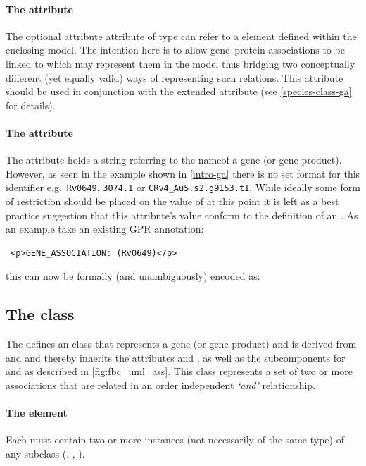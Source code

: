 \paragraph{The  attribute}
The optional attribute  attribute of type  can  refer to a \Species element defined within the enclosing model. The intention here is to allow gene--protein associations to be linked to \Species which may represent them in the model thus bridging two conceptually different (yet equally valid) ways of representing such relations. This attribute should be used in conjunction with the extended \Species attribute  (see \ref{species-class-ga} for details).

\paragraph{The  attribute}
The  attribute holds a string referring to the nameof a gene (or gene product). However, as seen in the example shown in \ref{intro-ga} there is no set format for this identifier e.g.~\verb+Rv0649+, \verb+3074.1+ or \verb+CRv4_Au5.s2.g9153.t1+. While ideally some form of restriction should be placed on the value of  at this point it is left as a best practice suggestion that this attribute's value conform to the definition of an . As an example take an existing GPR annotation:
\begin{verbatim}
 <p>GENE_ASSOCIATION: (Rv0649)</p>
\end{verbatim} 
%
this can now be formally (and unambiguously) encoded as:
%

\subsection{The \FBC {} class}
\label{and-class}

The \FBCPackage defines an \GeneAnd class that represents a gene (or gene product) and is derived from and \Association and thereby inherits the \SBase attributes  and , as well as the subcomponents for \Annotation and \Notes as described in \ref{fig:fbc_uml_ass}. This class represents a set of two or more associations that are related in an order independent \emph{`and'} relationship.

\paragraph{The  element}
Each \GeneAnd must contain two or more instances (not necessarily of the same type) of any \Association subclass (\GeneAnd, \GeneOr, \Gene).

